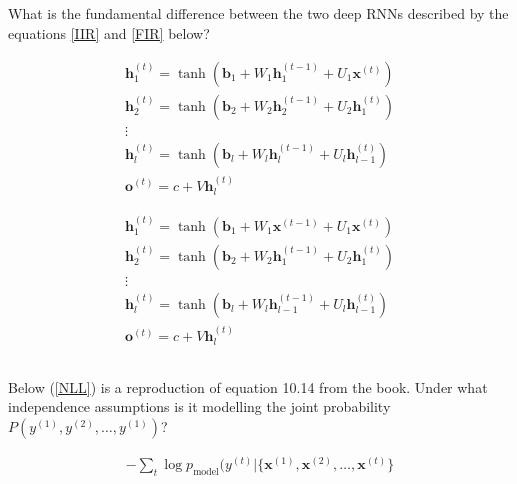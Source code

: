 \documentclass[a4paper]{report}
\renewcommand{\vec}[1]{{\boldsymbol{#1}}}
\newcommand{\tvec}[2]{{\vec{#1}^{(#2)}}}
\newcommand{\stvec}[3]{{\vec{#1}_{#2}^{(#3)}}}
\begin{document}
\subsection{} What is the fundamental difference between the two deep RNNs described by the equations \ref{IIR} and \ref{FIR} below?

  \begin{equation}
    \label{IIR}
\begin{gathered}
  \stvec{h}{1}{t} = \tanh(\vec{b}_1 + W_1 \stvec{h}{1}{t-1} + U_1\tvec{x}{t})\\
  \stvec{h}{2}{t} = \tanh(\vec{b}_2 + W_2 \stvec{h}{2}{t-1} + U_2\stvec{h}{1}{t})\\
  \vdots \\
    \stvec{h}{l}{t} = \tanh(\vec{b}_l + W_l \stvec{h}{l}{t-1} + U_l\stvec{h}{l-1}{t})\\
    \tvec{o}{t} = c + V\stvec{h}{l}{t}
\end{gathered}
\end{equation}

  \vspace{10mm}

  \begin{equation}
    \label{FIR}
\begin{gathered}
  \stvec{h}{1}{t} = \tanh(\vec{b}_1 + W_1 \tvec{x}{t-1} + U_1\tvec{x}{t})\\
  \stvec{h}{2}{t} = \tanh(\vec{b}_2 + W_2 \stvec{h}{1}{t-1} + U_2\stvec{h}{1}{t})\\
  \vdots \\
    \stvec{h}{l}{t} = \tanh(\vec{b}_l + W_l \stvec{h}{l-1}{t-1} + U_l\stvec{h}{l-1}{t})\\
    \tvec{o}{t} = c + V\stvec{h}{l}{t}
\end{gathered}
\end{equation}

  \subsection{} Below (\ref{NLL}) is a reproduction of equation 10.14 from the book. Under what independence assumptions is it modelling the joint probability $P(y^{(1)}, y^{(2)}, \ldots, y^{(1)})$?

  \begin{equation}
    \label{NLL}
    \begin{gathered}
      -\sum_t \log p_{\text{model}}(y^{(t)} | \{\tvec{x}{1}, \tvec{x}{2}, \ldots, \tvec{x}{t}\}
\end{gathered}
\end{equation}
\end{document}
